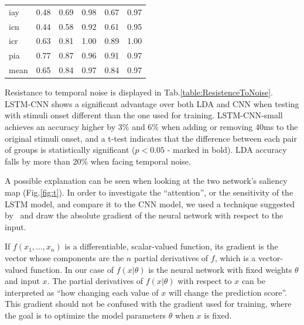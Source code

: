 \documentclass[
12pt, %
english, %
doublespacing, %
headsepline, %
]{MastersDoctoralThesis} %
\begin{document}
\begin{table}[t]
\begin{tabular}{l|ccccc}
		iay     &                  0.48 &                  0.69 &                            0.98 &                             0.67 &                                               0.97 \\
		icn     &                  0.44 &                  0.58 &                            0.92 &                             0.61 &                                               0.95 \\
		icr     &                  0.63 &                  0.81 &                            1.00 &                             0.89 &                                               1.00 \\
		pia     &                  0.77 &                  0.87 &                            0.96 &                             0.91 &                                               0.97 \\
		mean    &                  0.65 &                  0.84 &                            0.97 &                             0.84 &                                               0.97 \\
		\bottomrule
	\end{tabular}
\end{table}

\vspace{5mm}

Resistance to temporal noise is displayed in Tab.\ref{table:ResistenceToNoise}. LSTM-CNN shows a significant advantage over both LDA and CNN when testing with stimuli onset different than the one used for training. LSTM-CNN-small achieves an accuracy higher by 3\% and 6\% when adding or removing 40ms to the original stimuli onset, and a t-test indicates that the difference between each pair of groups is statistically significant ($p < 0.05$ - marked in bold). LDA accuracy falls by more than 20\% when facing temporal noise.

A possible explanation can be seen when looking at the two network's saliency map (Fig.\ref{fig:t}). In order to investigate the ``attention'', or the sensitivity of the LSTM model, and compare it to the CNN model, we used a technique suggested by~\cite{graves2012supervised} and draw the absolute gradient of the neural network with respect to the input.

If $f(x_{1}, ..., x_{n})$ is a differentiable, scalar-valued function, its gradient is the vector whose components are the $n$ partial derivatives of $f$, which is a vector-valued function. In our case of $f(x|\theta)$ is the neural network with fixed weights $\theta$ and input $x$. The partial derivatives of $f(x|\theta)$ with respect to $x$ can be interpreted as ``how changing each value of $x$ will change the prediction score''. This gradient should not be confused with the gradient used for training, where the goal is to optimize the model parameters $\theta$ when $x$ is fixed.
\end{document}
